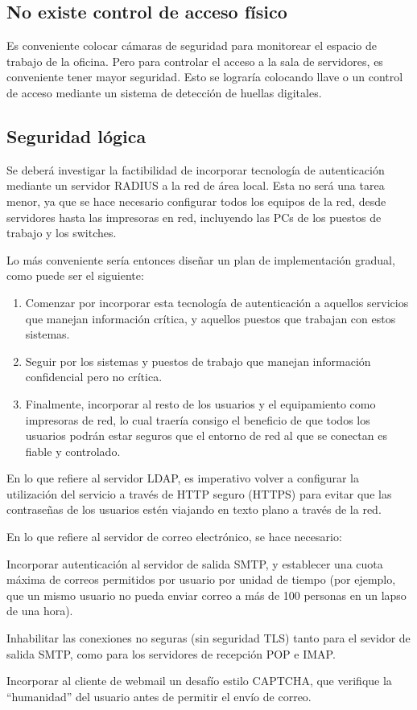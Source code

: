 \documentclass[a4paper,11pt,oneside]{article}
\begin{document}
\subsection{No existe control de acceso físico}
Es conveniente colocar cámaras de seguridad para monitorear el espacio
de trabajo de la oficina. Pero para controlar el acceso a la sala de
servidores, es conveniente tener mayor seguridad. Esto se lograría
colocando llave o un control de acceso mediante un sistema de
detección de huellas digitales.
%
\newpage
\subsection{Seguridad lógica}
Se deberá investigar la factibilidad de incorporar tecnología de
autenticación mediante un servidor RADIUS a la red de área local.
Esta no será una tarea menor, ya que se hace necesario configurar todos
los equipos de la red, desde servidores hasta las impresoras en red, incluyendo
las PCs de los puestos de trabajo y los switches.

Lo más conveniente sería entonces diseñar un plan de implementación
gradual, como puede ser el siguiente:
\begin{enumerate}
\item Comenzar por incorporar esta tecnología de autenticación a
  aquellos servicios que manejan información crítica, y aquellos
  puestos que trabajan con estos sistemas.
\item Seguir por los sistemas y puestos de trabajo que manejan
  información confidencial pero no crítica.
\item Finalmente, incorporar al resto de los usuarios y el
  equipamiento como impresoras de red, lo cual traería consigo el
  beneficio de que todos los usuarios podrán estar seguros que el
  entorno de red al que se conectan es fiable y controlado.
\end{enumerate}

En lo que refiere al servidor LDAP, es imperativo volver a configurar
la utilización del servicio a través de HTTP seguro (HTTPS) para
evitar que las contraseñas de los usuarios estén viajando en texto
plano a través de la red.

En lo que refiere al servidor de correo electrónico, se hace necesario:
\begin{itemize*}
\item Incorporar autenticación al servidor de salida SMTP, y
  establecer una cuota máxima de correos permitidos por usuario por
  unidad de tiempo (por ejemplo, que un mismo usuario no pueda enviar
  correo a más de 100 personas en un lapso de una hora).
\item Inhabilitar las conexiones no seguras (sin seguridad TLS) tanto
  para el sevidor de salida SMTP, como para los servidores de
  recepción POP e IMAP.
\item Incorporar al cliente de webmail un desafío estilo CAPTCHA, que
  verifique la ``humanidad'' del usuario antes de permitir el envío de
  correo.
\end{itemize*}
\end{document}
